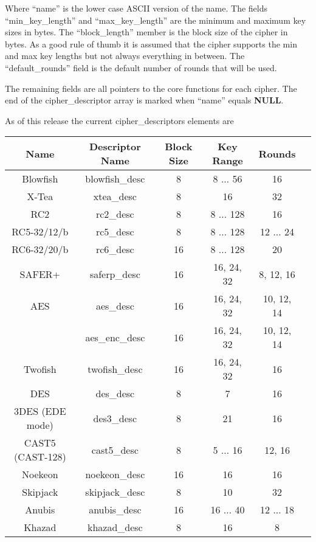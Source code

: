 \documentclass[a4paper]{book}
\begin{document}
Where ``name'' is the lower case ASCII version of the name.  The fields ``min\_key\_length'' and ``max\_key\_length'' 
are the minimum and maximum key sizes in bytes.  The ``block\_length'' member is the block size of the cipher
in bytes.  As a good rule of thumb it is assumed that the cipher supports
the min and max key lengths but not always everything in between.  The ``default\_rounds'' field is the default number
of rounds that will be used.

The remaining fields are all pointers to the core functions for each cipher.  The end of the cipher\_descriptor array is
marked when ``name'' equals {\bf NULL}.

As of this release the current cipher\_descriptors elements are

\begin{small}
\begin{center}
\begin{tabular}{|c|c|c|c|c|c|}
     \hline Name & Descriptor Name & Block Size & Key Range & Rounds \\
     \hline Blowfish & blowfish\_desc & 8 & 8 $\ldots$ 56 & 16 \\
     \hline X-Tea & xtea\_desc & 8 & 16 & 32 \\
     \hline RC2 & rc2\_desc & 8 & 8 $\ldots$ 128 & 16 \\
     \hline RC5-32/12/b & rc5\_desc & 8 & 8 $\ldots$ 128 & 12 $\ldots$ 24 \\
     \hline RC6-32/20/b & rc6\_desc & 16 & 8 $\ldots$ 128 & 20 \\
     \hline SAFER+ & saferp\_desc &16 & 16, 24, 32 & 8, 12, 16 \\
     \hline AES & aes\_desc & 16 & 16, 24, 32 & 10, 12, 14 \\
                & aes\_enc\_desc & 16 & 16, 24, 32 & 10, 12, 14 \\
     \hline Twofish & twofish\_desc & 16 & 16, 24, 32 & 16 \\
     \hline DES & des\_desc & 8 & 7 & 16 \\
     \hline 3DES (EDE mode) & des3\_desc & 8 & 21 & 16 \\
     \hline CAST5 (CAST-128) & cast5\_desc & 8 & 5 $\ldots$ 16 & 12, 16 \\
     \hline Noekeon & noekeon\_desc & 16 & 16 & 16 \\
     \hline Skipjack & skipjack\_desc & 8 & 10 & 32 \\
     \hline Anubis & anubis\_desc & 16 & 16 $\ldots$ 40 & 12 $\ldots$ 18 \\
     \hline Khazad & khazad\_desc & 8 & 16 & 8 \\
     \hline
\end{tabular}
\end{center}
\end{small}
\end{document}
